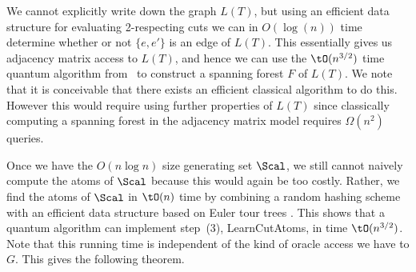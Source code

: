 We cannot explicitly write down the graph $L(T)$, but using an efficient data structure for evaluating 2-respecting cuts \cite{MN20,GMW20c} we can in $O(\log(n))$ time determine 
whether or not $\{e,e'\}$ is an edge of $L(T)$.
This essentially gives us adjacency matrix access to $L(T)$, and hence we can use the $\tO(n^{3/2})$ time quantum algorithm from~\cite{DHHM06} to construct a spanning forest $F$ of $L(T)$.
We note that it is conceivable that there exists an efficient classical algorithm to do this.
However this would require using further properties of $L(T)$ since classically computing a spanning forest in the adjacency matrix model requires $\Omega(n^2)$ queries.

Once we have the $O(n \log n)$ size generating set $\Scal$, we still cannot naively compute the atoms of $\Scal$ because this would again be too costly.
Rather, we find the atoms of $\Scal$ in $\tO(n)$ time by combining a random hashing scheme with an efficient data structure based on Euler tour trees \cite{HK95}.
This shows that a quantum algorithm can implement step~(3), LearnCutAtoms, in time $\tO(n^{3/2})$.  Note that this running time is independent of the kind of oracle access we have to $G$.  
This gives the following theorem.

